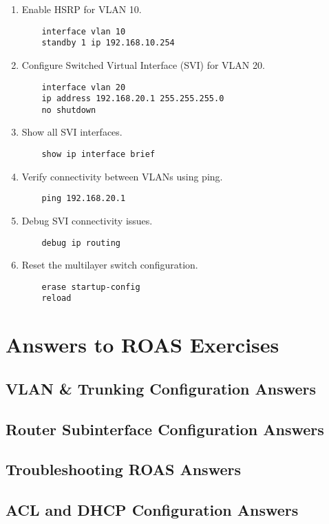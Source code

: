 \documentclass[a4paper]{book}
\begin{document}
\begin{enumerate}
    \item Enable HSRP for VLAN 10.
    \begin{lstlisting}
    interface vlan 10
    standby 1 ip 192.168.10.254
    \end{lstlisting}

    \item Configure Switched Virtual Interface (SVI) for VLAN 20.
    \begin{lstlisting}
    interface vlan 20
    ip address 192.168.20.1 255.255.255.0
    no shutdown
    \end{lstlisting}

    \item Show all SVI interfaces.
    \begin{lstlisting}
    show ip interface brief
    \end{lstlisting}

    \item Verify connectivity between VLANs using ping.
    \begin{lstlisting}
    ping 192.168.20.1
    \end{lstlisting}

    \item Debug SVI connectivity issues.
    \begin{lstlisting}
    debug ip routing
    \end{lstlisting}

    \item Reset the multilayer switch configuration.
    \begin{lstlisting}
    erase startup-config
    reload
    \end{lstlisting}
\end{enumerate}
\chapter{Answers to ROAS Exercises}
\section{VLAN \& Trunking Configuration Answers}
\section{Router Subinterface Configuration Answers}
\section{Troubleshooting ROAS Answers}
\section{ACL and DHCP Configuration Answers}
\end{document}
